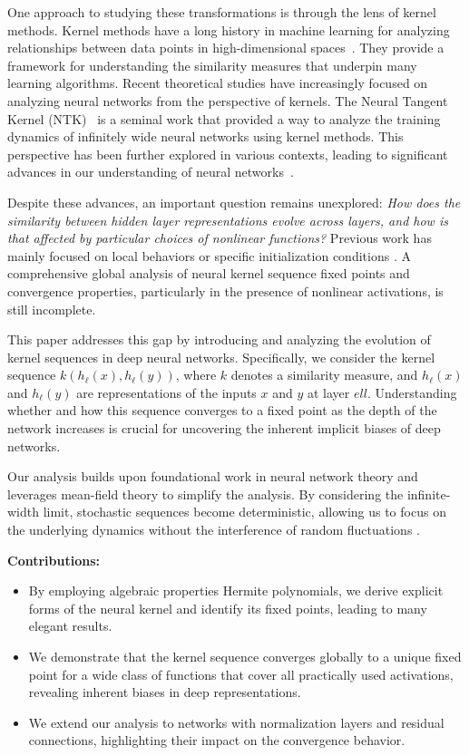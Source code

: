 \documentclass[twoside]{article}
\theoremstyle{definition}
\begin{document}
One approach to studying these transformations is through the lens of kernel methods. Kernel methods have a long history in machine learning for analyzing relationships between data points in high-dimensional spaces~\citep{scholkopf2002learning, smola2004tutorial}. They provide a framework for understanding the similarity measures that underpin many learning algorithms. Recent theoretical studies have increasingly focused on analyzing neural networks from the perspective of kernels. The Neural Tangent Kernel (NTK)~\citep{jacot2018neural} is a seminal work that provided a way to analyze the training dynamics of infinitely wide neural networks using kernel methods. This perspective has been further explored in various contexts, leading to significant advances in our understanding of neural networks~\citep{lee2019wide, arora2019exact, yang2019scaling}.

Despite these advances, an important question remains unexplored: \emph{How does the similarity between hidden layer representations evolve across layers, and how is that affected by particular choices of nonlinear functions?} Previous work has mainly focused on local behaviors or specific initialization conditions \citep{saxe2013exact, schoenholz2016deep, pennington2017resurrecting}. A comprehensive global analysis of neural kernel sequence fixed points and convergence properties, particularly in the presence of nonlinear activations, is still incomplete.

This paper addresses this gap by introducing and analyzing the evolution of kernel sequences in deep neural networks. Specifically, we consider the kernel sequence $ k (h_\ell (x), h_\ell (y)) $, where $ k$ denotes a similarity measure, and $ h_\ell (x) $ and $ h_\ell (y) $ are representations of the inputs $ x$ and $ y$ at layer $ ell$. Understanding whether and how this sequence converges to a fixed point as the depth of the network increases is crucial for uncovering the inherent implicit biases of deep networks.

Our analysis builds upon foundational work in neural network theory and leverages mean-field theory to simplify the analysis. By considering the infinite-width limit, stochastic sequences become deterministic, allowing us to focus on the underlying dynamics without the interference of random fluctuations \citep{poole2016exponential, yang2019meanfield, mei2019mean}.

\textbf{Contributions:} 
\begin{itemize}
    \item By employing algebraic properties Hermite polynomials, we derive explicit forms of the neural kernel and identify its fixed points, leading to many elegant results.  
    \item We demonstrate that the kernel sequence converges globally to a unique fixed point for a wide class of functions that cover all practically used activations, revealing inherent biases in deep representations. 
    \item We extend our analysis to networks with normalization layers and residual connections, highlighting their impact on the convergence behavior.
\end{itemize}
\end{document}
